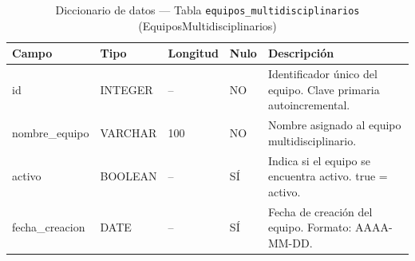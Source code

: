 \begin{table}[H]
	\centering
	\caption{Diccionario de datos --- Tabla \texttt{equipos\_multidisciplinarios} (EquiposMultidisciplinarios)}
	\label{tab:data-dict-equipos_multidisciplinarios}
	\scriptsize
	\begin{tabular}{>{\ttfamily\raggedright\arraybackslash}p{3.6cm} p{1.6cm} p{1.3cm} p{0.7cm} p{5.6cm}}
		\toprule
		\textbf{Campo} & \textbf{Tipo} & \textbf{Longitud} & \textbf{Nulo} & \textbf{Descripción} \\
		\midrule
		id & INTEGER & -- & NO & Identificador único del equipo. Clave primaria autoincremental. \\
		nombre\_equipo & VARCHAR & 100 & NO & Nombre asignado al equipo multidisciplinario. \\
		activo & BOOLEAN & -- & SÍ & Indica si el equipo se encuentra activo. true = activo. \\
		fecha\_creacion & DATE & -- & SÍ & Fecha de creación del equipo. Formato: AAAA-MM-DD. \\
		\bottomrule
	\end{tabular}
\end{table}

